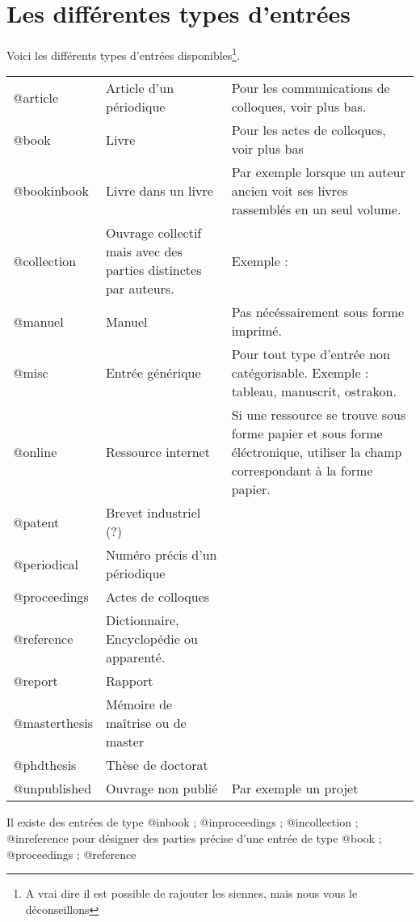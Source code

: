 \section{Les différentes types d'entrées}
Voici les différents types d'entrées disponibles\footnote{A vrai dire il est possible de rajouter les siennes, mais nous vous le déconseillons}.

\begin{longtable}{lll}
	@article				& Article d'un périodique		& Pour les communications de colloques, voir plus bas. \\
	@book					& Livre							& Pour les actes de colloques, voir plus bas \\
	@bookinbook				& Livre dans un livre			& Par exemple lorsque un auteur ancien voit ses livres rassemblés en un seul volume. \\		
	@collection				& Ouvrage collectif mais avec des parties distinctes par auteurs.				& Exemple : \\
	@manuel					& Manuel						& Pas nécéssairement sous forme imprimé.\\
	@misc					& Entrée générique				& Pour tout type d'entrée non catégorisable. Exemple : tableau, manuscrit, ostrakon. \\
	@online					& Ressource internet			& Si une ressource se trouve sous forme papier et sous forme éléctronique, utiliser la champ correspondant à la forme papier. \\
	@patent					& Brevet industriel		 (?)	& \\
	@periodical				& Numéro précis d'un périodique & \\
	@proceedings			& Actes de colloques			& \\
	@reference				& Dictionnaire, Encyclopédie ou apparenté. & \\ 
	@report					& Rapport						& \\
	@masterthesis			& Mémoire de maîtrise ou de master& \\	
	@phdthesis				& Thèse de doctorat				& \\
	@unpublished			& Ouvrage non publié			& Par exemple un projet\\
	
\end{longtable}

Il existe des entrées de type @inbook ; @inproceedings ; @incollection ; @inreference pour désigner des parties précise d'une entrée de type @book ; @proceedings ; @reference